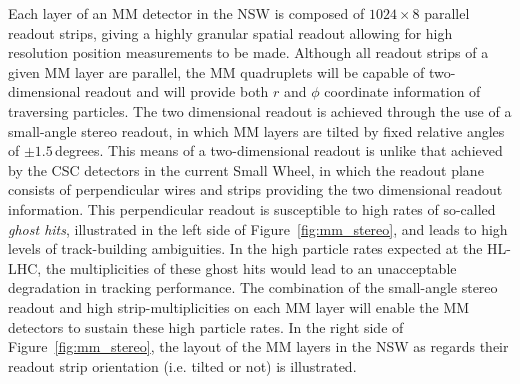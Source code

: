 Each layer of an MM detector in the NSW is composed of $1024 \times 8$ parallel readout strips, giving
a highly granular spatial readout allowing for high resolution position measurements to be made.
Although all readout strips of a given MM layer are parallel, the MM quadruplets will be capable
of two-dimensional readout and will provide both $r$ and $\phi$ coordinate information
of traversing particles.
The two dimensional readout is achieved through the use of a small-angle stereo readout, in which
MM layers are tilted by fixed relative angles of $\pm 1.5$\,degrees.
This means of a two-dimensional readout is unlike that achieved by the CSC detectors in the current
Small Wheel, in which the readout plane consists of perpendicular wires and strips providing
the two dimensional readout information.
This perpendicular readout is susceptible to high rates of so-called \textit{ghost hits},
illustrated in the left side of Figure~\ref{fig:mm_stereo}, and leads to high levels of track-building ambiguities.
In the high particle rates expected at the HL-LHC, the multiplicities of these ghost hits would
lead to an unacceptable degradation in tracking performance.
The combination of the small-angle stereo readout and high strip-multiplicities on each MM layer will
enable the MM detectors to sustain these high particle rates.
In the right side of Figure~\ref{fig:mm_stereo}, the layout of the MM layers in the NSW as regards
their readout strip orientation (i.e. tilted or not) is illustrated.

